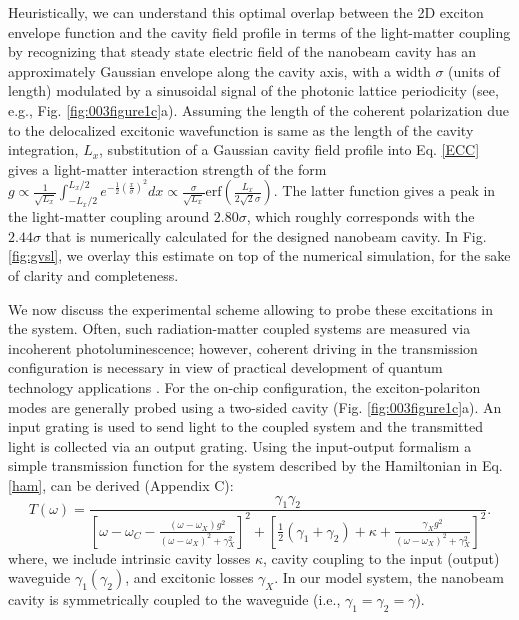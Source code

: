 \documentclass{achemso}
\begin{document}
Heuristically, we can understand this optimal overlap between the 2D exciton envelope function and the cavity field profile in terms of the light-matter coupling by recognizing that steady state electric field of the nanobeam cavity has an approximately Gaussian envelope along the cavity axis, with a width $\sigma$ (units of length) modulated by a sinusoidal signal of the photonic lattice periodicity \cite{quan_deterministic_2011} (see, e.g., Fig. \ref{fig:003figure1c}a). Assuming the length of the coherent polarization due to the delocalized excitonic wavefunction is same as the length of the cavity integration, $L_{x}$, substitution of a Gaussian cavity field profile into Eq. \ref{ECC} gives a light-matter interaction strength of the form $g \propto \frac{1}{\sqrt{L_{x}}} \int_{-L_{x}/2}^{L_{x}/2} e^{-\frac{1}{2} \left( \frac{x}{\sigma} \right)^{2}} dx \propto \frac{\sigma}{\sqrt{L_{x}}} \mathrm{erf} (\frac{L_{x}}{2 \sqrt{2} \sigma})$. The latter function gives a peak in the light-matter coupling around $2.80 \sigma$, which roughly corresponds with the $2.44 \sigma$ that is numerically calculated for the designed nanobeam cavity. In Fig.\ref{fig:gvsl}, we overlay this estimate on top of the numerical simulation, for the sake of clarity and completeness.

We now discuss the experimental scheme allowing to probe these excitations in the system. Often, such radiation-matter coupled systems are measured via incoherent photoluminescence; however, coherent driving in the transmission configuration is necessary in view of practical development of quantum technology applications \cite{englund_resonant_2010}. For the on-chip configuration, the exciton-polariton modes are generally probed using a two-sided cavity \cite{collett_squeezing_1984} (Fig. \ref{fig:003figure1c}a). An input grating is used to send light to the coupled system and the transmitted light is collected via an output grating. Using the input-output formalism \cite{gardiner_input_1985} a simple transmission function for the system described by the Hamiltonian in Eq. \ref{ham}, can be derived (Appendix C):
\begin{equation}\label{trans}
	T(\omega) = \frac{\gamma_{1} \gamma_{2}}{ \left[ \omega - \omega_{C} - \frac{ (\omega - \omega_{X}) g^2 }{ (\omega - \omega_{X})^2 + \gamma_{X}^2} \right ]^2+\left[ \frac{1}{2}( \gamma_{1} + \gamma_{2} ) + \kappa + \frac{ \gamma_{X} g^2 }{ (\omega - \omega_{X})^2 + \gamma_{X}^2} \right ]^2}.
\end{equation}
where, we include intrinsic cavity losses $\kappa$, cavity coupling to the input (output) waveguide $\gamma_1 (\gamma_2)$, and excitonic losses $\gamma_{X}$. In our model system, the nanobeam cavity is symmetrically coupled to the waveguide (i.e., $\gamma_1=\gamma_2=\gamma$).
\end{document}

